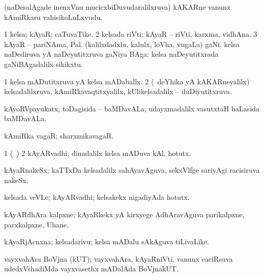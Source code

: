 {{{{{{\begin{center}
\bentry
{} 
\gl{\nA}
\expl{}
\bmng
(naDesalAgade inenxVnu mucicxbiDuvudaralilxruva) kAKARne \mo vanunx kAmiRkaru vahisikoLuLxvudu. 
\emng
\eentry

\bentry
{} 
\gl{\nA}
\expl{}
\bmng
\bnum
\num{1} kelsa; kAyaR; caTuvaTike. 
\num{2} kelsada riVti; kAyaR -- riVti, karxma, vidhAna. 
\num{3} kAyaR -- pariNAma, Pal. 
\banum
{} (kalilxdadxlu, kalulx, loVha, \mo vugaLa) gaNi. 
 kelsa naDediruva yA naDeyutitxruva gaNiya BAga:  kelsa naDeyutitxrada gaNiBAgadalilx sikikxtu. 
\eanum
\numie
\enum
\emng
\eentry

\bentry
{} 
\gl{\gu}
\expl{}
\bmng
\bnum
\num{1} kelsa mADutitxruva yA kelsa mADaballx. 
\num{2} (\kanmu\ deYhika yA kAKARneyalilx) kelsadalilxruva, kAmiRkavaqtitxyalilx, kUlikelsadalilx -- duDiyutitxruva. 
\enum
\emng
\eentry

\bentry
{} 
\gl{\nA}
\expl{}
\bmng
kAyoRVpayukatx, toDagisida -- baMDavALa; udayxmadalilx vasutxtaH baLasida baMDavALa. 
\emng
\eentry

\bentry
{} 
\gl{\nA}
\expl{}
\bmng
kAmiRka vagaR; sharxmikavagaR. 
\emng
\eentry

\bentry
{} 
\gl{\nA}
\expl{}
\bmng
\bnum
\num{1} (\kanmu\ \birx)  
\num{2} kAyARvadhi; dinadalilx kelsa mADuva kAl, hotutx. 
\enum
\emng
\eentry

\bentry
{} 
\gl{\nA}
\expl{}
\bmng
kAyaRnakeSx; kaTTxDa kelsadalilx sahAyavAguva, sekxVlfge sariyAgi racisiruva nakeSx. 
\emng
\eentry

\bentry
{} 
\gl{\nA}
\expl{}
\bmng
kelsada veVLe; kAyARvadhi; kelsakekx nigadiyAda hotutx. 
\emng
\eentry

\bentry
{} 
\gl{\nA}
\expl{}
\bmng
kAyARdhAra kalpxne; kAyaRkekx yA kirxyege AdhAravAguva parikalpxne, parxkalpxne, Uhane. 
\emng
\eentry

\bentry
{} 
\gl{\nA}
\expl{}
\bmng
kAyaRjAcnxna; kelsadarivu; kelsa mADalu sAkAguva tiLivaLike. 
\emng
\eentry

\bentry
{} 
\gl{\nA}
\expl{}
\bmng
vayxvahAra BoVjna (kUT); vayxvahAra, kAyaRniVti, \mo vanunx caciRsuva udedxVshadiMda vayxvasethx mADalAda BoVjnakUT. 
\emng
\eentry


\end{center}}}}}}}
